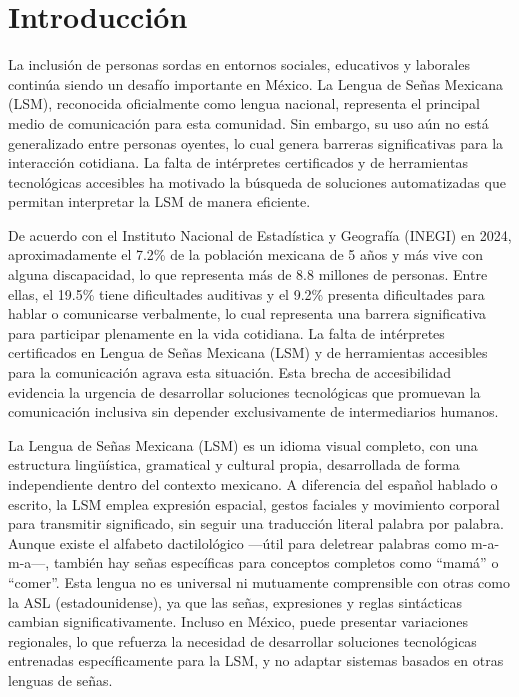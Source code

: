 	\section{Introducción}
	La inclusión de personas sordas en entornos sociales, educativos y laborales continúa siendo un
	desafío importante en México. La Lengua de Señas Mexicana (LSM), reconocida oficialmente
	como lengua nacional, representa el principal medio de comunicación para esta comunidad. Sin
	embargo, su uso aún no está generalizado entre personas oyentes, lo cual genera barreras
	significativas para la interacción cotidiana. La falta de intérpretes certificados y de herramientas
	tecnológicas accesibles ha motivado la búsqueda de soluciones automatizadas que permitan
	interpretar la LSM de manera eficiente.
	
	De acuerdo con el Instituto Nacional de Estadística y Geografía (INEGI) en 2024,
	aproximadamente el 7.2\% de la población mexicana de 5 años y más vive con alguna
	discapacidad, lo que representa más de 8.8 millones de personas. Entre ellas, el 19.5\% tiene dificultades auditivas y el 9.2\% presenta dificultades para hablar o comunicarse verbalmente, lo
	cual representa una barrera significativa para participar plenamente en la vida cotidiana. La falta
	de intérpretes certificados en Lengua de Señas Mexicana (LSM) y de herramientas accesibles
	para la comunicación agrava esta situación. Esta brecha de accesibilidad evidencia la urgencia de
	desarrollar soluciones tecnológicas que promuevan la comunicación inclusiva sin depender
	exclusivamente de intermediarios humanos.
	
	La Lengua de Señas Mexicana (LSM) es un idioma visual completo, con una estructura
	lingüística, gramatical y cultural propia, desarrollada de forma independiente dentro del contexto
	mexicano. A diferencia del español hablado o escrito, la LSM emplea expresión espacial, gestos
	faciales y movimiento corporal para transmitir significado, sin seguir una traducción literal
	palabra por palabra. Aunque existe el alfabeto dactilológico —útil para deletrear palabras como
	m-a-m-a—, también hay señas específicas para conceptos completos como “mamá” o “comer”.
	Esta lengua no es universal ni mutuamente comprensible con otras como la ASL
	(estadounidense), ya que las señas, expresiones y reglas sintácticas cambian significativamente.
	Incluso en México, puede presentar variaciones regionales, lo que refuerza la necesidad de
	desarrollar soluciones tecnológicas entrenadas específicamente para la LSM, y no adaptar
	sistemas basados en otras lenguas de señas.
	
